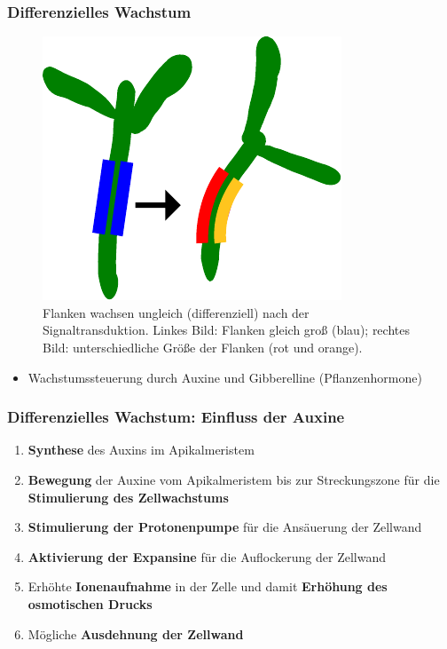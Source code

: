 \documentclass[aspectratio=169
]{beamer}
\begin{document}
\begin{frame}[<+(1)->]
\frametitle{Differenzielles Wachstum}
\begin{figure}
	\begin{minipage}[c]{0.4\textwidth}
		\centering
		\includegraphics[height=.6\textheight]{images/newdiff.pdf}
	\end{minipage}\hfill
	\begin{minipage}[c]{0.55\textwidth}
		\centering
		\caption{Flanken wachsen ungleich (differenziell) nach der Signaltransduktion. Linkes Bild: Flanken gleich groß (blau); rechtes Bild: unterschiedliche Größe der Flanken (rot und orange).} \label{diffwachs}
	\end{minipage}
\end{figure}

\begin{itemize}
	\item Wachstumssteuerung durch Auxine und Gibberelline (Pflanzenhormone)
\end{itemize}

\end{frame}

\begin{frame}[<+(1)->]
\frametitle{Differenzielles Wachstum: Einfluss der Auxine}
\begin{enumerate}
\item \textbf{Synthese} des Auxins im Apikalmeristem 
\item \textbf{Bewegung} der Auxine vom Apikalmeristem bis zur Streckungszone für die \textbf{Stimulierung des Zellwachstums}
\item \textbf{Stimulierung der Protonenpumpe} für die Ansäuerung der Zellwand 
\item \textbf{Aktivierung der Expansine} für die Auflockerung der Zellwand
\item Erhöhte \textbf{Ionenaufnahme} in der Zelle und damit \textbf{Erhöhung des osmotischen Drucks}
\item Mögliche \textbf{Ausdehnung der Zellwand}
\end{enumerate}
\end{frame}
	
\end{document}
